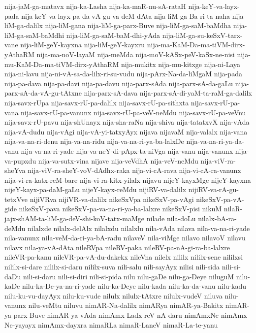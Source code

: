 {nija-jaM-ga-matavx
nija-ka-Lasha
nija-ka-maR-nu-sA-rataH
nija-keY-va-layx-pada
nija-keY-va-layx-pa-da-vA-gu-va-deM-dAta
nija-liM-ga-Ba-ri-ta-naha
nija-liM-ga-dalilx
nija-liM-gana
nija-liM-ga-parx-Buve
nija-liM-ga-saM-baMdha
nija-liM-ga-saM-baMdhi
nija-liM-ga-saM-baM-dhi-yAda
nija-liM-ga-su-keSxV-tarx-vane
nija-liM-geY-kayxna
nija-liM-geY-kayxru
nija-ma-KaM-Da-ma-tiVM-dirx-yAthaRM
nija-ma-noV-layaM
nija-meMda
nija-moV-kASx-peV-kaSx-ne-nisi
nija-mu-KaM-Da-ma-tiVM-dirx-yAthaRM
nija-mukitx
nija-mu-kitxge
nija-ni-Laya
nija-ni-lavu
nija-ni-vA-sa-da-lilx-ri-su-vudu
nija-pArx-Na-da-liMgaM
nija-pada
nija-pa-dava
nija-pa-davi
nija-pa-davu
nija-parx-sAda
nija-parx-sA-da-gaLu
nija-parx-sA-da-vA-gu-tAtxne
nija-parx-sA-dava
nija-parx-sA-di-yaM-ta-raM-ga-dalilx
nija-savx-rUpa
nija-savx-rU-pa-dalilx
nija-savx-rU-pa-sithxta
nija-savx-rU-pa-vana
nija-savx-rU-pa-vanunx
nija-savx-rU-pa-veV-neMdu
nija-savx-rU-pa-veVnu
nija-savx-rU-pavu
nija-shUnayx
nija-sha-raNa
nija-shiva
nija-tatatxvX
nija-vAda
nija-vA-dudu
nija-vAgi
nija-vA-yi-tatxyAyx
nijava
nijavaM
nija-valalx
nija-vana
nija-va-na-ri-denu
nija-va-na-ridu
nija-va-na-ri-ya-ba-lalxDe
nija-va-na-ri-ya-da-vanu
nija-va-na-ri-yade
nija-va-neY-di-pApx-ta-niVga
nija-vanu
nija-vanunx
nija-va-pupxdu
nija-va-sutx-vina
nijave
nija-veVdhA
nija-veV-neMdu
nija-viV-ra-sheYva
nija-viV-ra-sheY-voV-dAdhx-raka
nija-vi-cA-rava
nija-vi-cA-ra-vanunx
nija-vi-ra-katx-reM-bare
nija-vi-ra-kitx-yilalx
nijavu
nijeY-kayxMge
nijeY-kayxna
nijeY-kayx-pa-daM-gaLu
nijeY-kayx-reMdu
nijiRV-va-dalilx
nijiRV-va-rA-gu-tetxVve
nijiVRva
nijiVR-va-dalilx
nikeSxVpa
nikeSxV-pa-vAgi
nikeSxV-pa-vA-gide
nikeSxV-pava
nikeSxV-pa-va-na-ri-ya-ba-lalxre
nikeSxV-pisi
nikuM
nilaR-jajx-shAM-ta-liM-ga-deV-shi-koV-tatx-maMge
nilade
nila-doLu
nilalx-bA-ra-deMdu
nilalxde
nilalx-delAlx
nilalxdu
nilalxlu
nila-vAda
nilava
nila-va-na-ri-yade
nila-vanunx
nila-veM-da-ri-ya-bA-radu
nilaveV
nila-viMge
nilavo
nilavoV
nilavu
nilavx
nila-ya-vA-dAta
nileRVpa
nileRV-paka
nileRV-pa-nA-gi-ra-ba-lalxre
nileVR-pa-kanu
nileVR-pa-vA-du-dakekx
nileVna
nilelx
nililx
nililx-sene
nililxsi
nililx-si-dare
nililx-si-daru
nililx-suva
nili-salu
nili-sayAyx
nilisi
nili-sida
nili-si-daDu
nili-si-daru
nili-si-diri
nili-si-pida
nilu
nilu-gaDe
nilu-ga-Deye
niluguM
nilu-kaDe
nilu-ka-De-ya-na-ri-yade
nilu-ka-Deye
nilu-kada
nilu-ka-da-vanu
nilu-kadu
nilu-ku-vu-dayAyx
nilu-ku-vude
nilulx
nilulx-tAtxre
nilulx-vudeV
niluva
nilu-vanunx
nilu-veMtu
niluvu
nimAR-Na-dalilx
nimARya
nimAR-ya-Bakitx
nimAR-ya-parx-Buve
nimAR-ya-vAda
nimAmx-Ladx-reV-nA-daru
nimAmxNe
nimAmx-Ne-yayayx
nimAmx-dayxra
nimaRLa
nimaR-LaneV
nimaR-La-te-yanu
}
